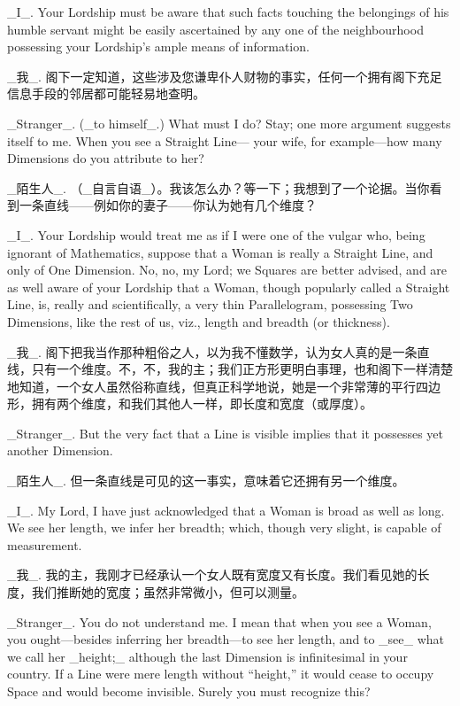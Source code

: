 \documentclass[12pt,UTF8]{ctexbook}
\begin{document}
\_I\_. Your Lordship must be aware that such facts touching the belongings of his humble servant might be easily ascertained by any one of the neighbourhood possessing your Lordship's ample means of information.

\_我\_. 阁下一定知道，这些涉及您谦卑仆人财物的事实，任何一个拥有阁下充足信息手段的邻居都可能轻易地查明。

\_Stranger\_. (\_to himself\_.) What must I do? Stay; one more argument suggests itself to me. When you see a Straight Line--- your wife, for example---how many Dimensions do you attribute to her?

\_陌生人\_. （\_自言自语\_）。我该怎么办？等一下；我想到了一个论据。当你看到一条直线——例如你的妻子——你认为她有几个维度？

\_I\_. Your Lordship would treat me as if I were one of the vulgar who, being ignorant of Mathematics, suppose that a Woman is really a Straight Line, and only of One Dimension. No, no, my Lord; we Squares are better advised, and are as well aware of your Lordship that a Woman, though popularly called a Straight Line, is, really and scientifically, a very thin Parallelogram, possessing Two Dimensions, like the rest of us, viz., length and breadth (or thickness).

\_我\_. 阁下把我当作那种粗俗之人，以为我不懂数学，认为女人真的是一条直线，只有一个维度。不，不，我的主；我们正方形更明白事理，也和阁下一样清楚地知道，一个女人虽然俗称直线，但真正科学地说，她是一个非常薄的平行四边形，拥有两个维度，和我们其他人一样，即长度和宽度（或厚度）。

\_Stranger\_. But the very fact that a Line is visible implies that it possesses yet another Dimension.

\_陌生人\_. 但一条直线是可见的这一事实，意味着它还拥有另一个维度。

\_I\_. My Lord, I have just acknowledged that a Woman is broad as well as long. We see her length, we infer her breadth; which, though very slight, is capable of measurement.

\_我\_. 我的主，我刚才已经承认一个女人既有宽度又有长度。我们看见她的长度，我们推断她的宽度；虽然非常微小，但可以测量。

\_Stranger\_. You do not understand me. I mean that when you see a Woman, you ought---besides inferring her breadth---to see her length, and to \_see\_ what we call her \_height;\_ although the last Dimension is infinitesimal in your country. If a Line were mere length without ``height,'' it would cease to occupy Space and would become invisible. Surely you must recognize this?
\end{document}
